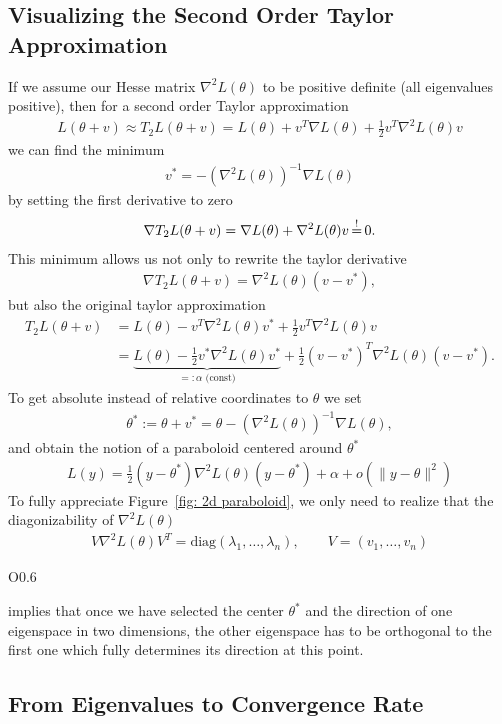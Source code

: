 \subsection{Visualizing the Second Order Taylor Approximation}
If we assume our Hesse matrix \(\nabla^2 L(\theta)\) to be positive definite
(all eigenvalues positive), then for a second order Taylor approximation
%
\begin{align*}
	L(\theta+v) \approx T_2L(\theta+v)
	= L(\theta) + v^T \nabla L(\theta) + \tfrac12 v^T \nabla^2 L(\theta) v
\end{align*}
%
we can find the minimum 
\begin{align*}
	v^* = -(\nabla^2 L(\theta))^{-1}\nabla L(\theta)
\end{align*}
by setting the first derivative to zero
%
\begin{align*}
	\nabla T_2L(\theta+v) = \nabla L(\theta) + \nabla^2L(\theta) v \xeq{!} 0.
\end{align*}
%
This minimum allows us not only to rewrite the taylor derivative
%
\begin{align*}
	\nabla T_2L(\theta+v) = \nabla^2 L(\theta)(v-v^*),
\end{align*}
%
but also the original taylor approximation
%
\begin{align*}
	T_2L(\theta+v)
	&= L(\theta) - v^T \nabla^2 L(\theta) v^* + \tfrac12 v^T \nabla^2 L(\theta) v \\
	&= \underbrace{L(\theta) - \tfrac12 v^* \nabla^2 L(\theta) v^*}_{=: \alpha \text{ (const)}}
	+ \tfrac12 (v-v^*)^T \nabla^2 L(\theta)(v-v^*).
\end{align*}
%
To get absolute instead of relative coordinates to \(\theta\) we set
%
\begin{align*}
	\theta^* := \theta + v^* = \theta -(\nabla^2 L(\theta))^{-1}\nabla L(\theta),
\end{align*}
%
and obtain the notion of a paraboloid centered around \(\theta^*\)
%
\begin{align}
	L(y) = \tfrac12 (y- \theta^*) \nabla^2 L(\theta) (y-\theta^*) + \alpha + o(\|y-\theta\|^2)
\end{align}
%
To fully appreciate Figure~\ref{fig: 2d paraboloid}, we only need to realize
that the diagonizability of \(\nabla^2 L(\theta)\)
%
\begin{align}\label{diagnalization of the Hesse matrix}
	V \nabla^2 L(\theta) V^T
	= \text{diag}(\lambda_1,\dots,\lambda_n), \qquad V=(v_1,\dots, v_n)
\end{align}
%
\begin{wrapfigure}{O}{0.6\textwidth}
	\centering
	\def\svgwidth{0.58\textwidth}
	
	\caption{Assuming \(\theta^*=0\), \(\lambda_1=1, \lambda_2=2\), \(v_1=(\sin(1), \cos(1))\)}
	\label{fig: 2d paraboloid}
\end{wrapfigure}
%
implies that once we have selected the center \(\theta^*\) and the direction of
one eigenspace in two dimensions, the other eigenspace has to be
orthogonal to the first one which fully determines its direction at this point. 

\subsection{From Eigenvalues to Convergence Rate}




\endinput